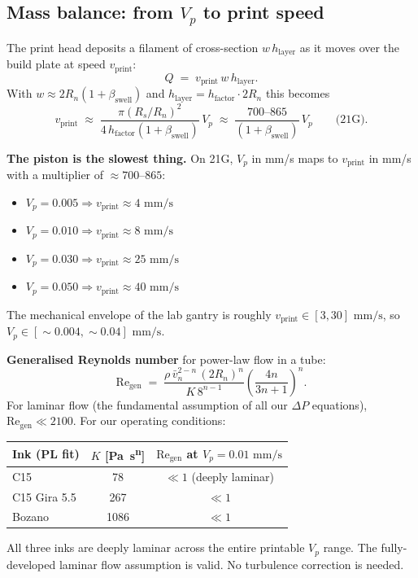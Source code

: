 \documentclass[11pt,a4paper]{article}
\newcommand{\mms}{\,\mathrm{mm/s}}
\newcommand{\Rey}{\mathrm{Re}}
\begin{document}
\subsection{Mass balance: from $V_p$ to print speed}

The print head deposits a filament of cross-section $w\,h_\mathrm{layer}$
as it moves over the build plate at speed $v_\mathrm{print}$:
\begin{equation}
Q \;=\; v_\mathrm{print}\, w\, h_\mathrm{layer}.
\label{eq:vprint}
\end{equation}
With $w\approx 2R_n(1+\beta_\mathrm{swell})$ and
$h_\mathrm{layer}=h_\mathrm{factor}\cdot 2R_n$ this becomes
\begin{equation}
v_\mathrm{print}
\;\approx\;
\frac{\pi(R_s/R_n)^2}{4\,h_\mathrm{factor}(1+\beta_\mathrm{swell})}\,V_p
\;\approx\; \frac{700\text{--}865}{(1+\beta_\mathrm{swell})}\,V_p
\qquad\text{(21G)}.
\label{eq:vprint_Vp}
\end{equation}

\begin{intuitionbox}
\textbf{The piston is the slowest thing.} On 21G, $V_p$ in \si{\mm/\s}
maps to $v_\mathrm{print}$ in \si{\mm/\s} with a multiplier of
$\approx 700$--$865$:
\begin{itemize}[leftmargin=1.4em,itemsep=1pt]
\item $V_p=0.005 \Rightarrow v_\mathrm{print}\approx 4\,\mms$
\item $V_p=0.010 \Rightarrow v_\mathrm{print}\approx 8\,\mms$
\item $V_p=0.030 \Rightarrow v_\mathrm{print}\approx 25\,\mms$
\item $V_p=0.050 \Rightarrow v_\mathrm{print}\approx 40\,\mms$
\end{itemize}
The mechanical envelope of the lab gantry is roughly
$v_\mathrm{print}\in[3,30]\,\mms$, so $V_p\in[\sim 0.004,\sim 0.04]\,\mms$.
\end{intuitionbox}

\begin{dimensionlessbox}
\textbf{Generalised Reynolds number} for power-law flow in a tube:
\begin{equation}
\Rey_\mathrm{gen} \;=\;
\frac{\rho\,\bar v_n^{2-n}\,(2R_n)^n}{K\,8^{n-1}}
\left(\frac{4n}{3n+1}\right)^n.
\label{eq:Re_gen}
\end{equation}
For laminar flow (the fundamental assumption of all our $\Delta P$
equations), $\Rey_\mathrm{gen}\ll 2100$. For our operating conditions:

\medskip\centering
\begin{tabular}{lcc}
\toprule
Ink (PL fit) & $K$ [\si{\Pa\s^n}] & $\Rey_\mathrm{gen}$ at $V_p=0.01\,\mms$ \\
\midrule
C15           & 78   & $\ll 1$ (deeply laminar) \\
C15 Gira 5.5  & 267  & $\ll 1$ \\
Bozano        & 1086 & $\ll 1$ \\
\bottomrule
\end{tabular}
\medskip\flushleft
All three inks are deeply laminar across the entire printable $V_p$
range. The fully-developed laminar flow assumption is valid. No
turbulence correction is needed.
\end{dimensionlessbox}
\end{document}
